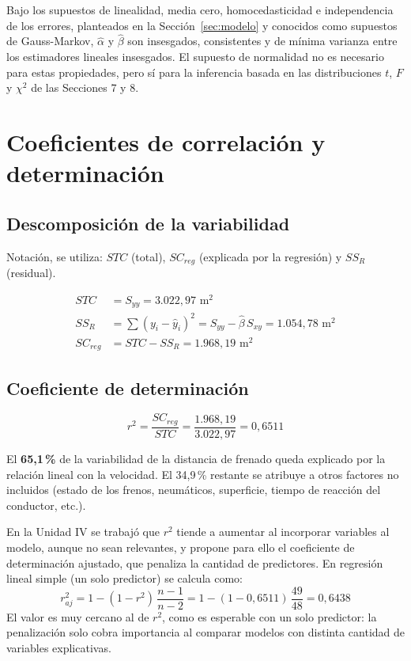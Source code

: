 \documentclass[12pt,a4paper]{article}
\begin{document}
Bajo los supuestos de linealidad, media cero, homocedasticidad e independencia de los errores, planteados en la Sección~\ref{sec:modelo} y conocidos como supuestos de Gauss-Markov, $\hat{\alpha}$ y $\hat{\beta}$ son insesgados, consistentes y de mínima varianza entre los estimadores lineales insesgados. El supuesto de normalidad no es necesario para estas propiedades, pero sí para la inferencia basada en las distribuciones $t$, $F$ y $\chi^2$ de las Secciones 7 y 8.

\section{Coeficientes de correlación y determinación}

\subsection{Descomposición de la variabilidad}

\begin{nota}[Aclaración:]
Notación, se utiliza: $STC$ (total), $SC_{reg}$ (explicada por la regresión) y $SS_R$ (residual).
\end{nota}

\begin{align}
STC &= S_{yy} = 3.022{,}97 \text{ m}^2 \\
SS_R &= \sum (y_i - \hat{y}_i)^2 = S_{yy} - \hat{\beta}\,S_{xy} = 1.054{,}78 \text{ m}^2 \\
SC_{reg} &= STC - SS_R = 1.968{,}19 \text{ m}^2
\end{align}

\subsection{Coeficiente de determinación}

\begin{equation}
r^2 = \frac{SC_{reg}}{STC} = \frac{1.968{,}19}{3.022{,}97} = 0{,}6511
\end{equation}

El \textbf{65{,}1\,\%} de la variabilidad de la distancia de frenado queda explicado por la relación lineal con la velocidad. El 34{,}9\,\% restante se atribuye a otros factores no incluidos (estado de los frenos, neumáticos, superficie, tiempo de reacción del conductor, etc.). 

En la Unidad IV se trabajó que $r^2$ tiende a aumentar al incorporar variables al modelo, aunque no sean relevantes, y propone para ello el coeficiente de determinación ajustado, que penaliza la cantidad de predictores. En regresión lineal simple (un solo predictor) se calcula como:
\begin{equation}
	r^2_{aj} = 1 - (1 - r^2)\,\frac{n-1}{n-2} = 1 - (1 - 0{,}6511)\,\frac{49}{48} = 0{,}6438
\end{equation}
El valor es muy cercano al de $r^2$, como es esperable con un solo predictor: la penalización solo cobra importancia al comparar modelos con distinta cantidad de variables explicativas.
\end{document}
